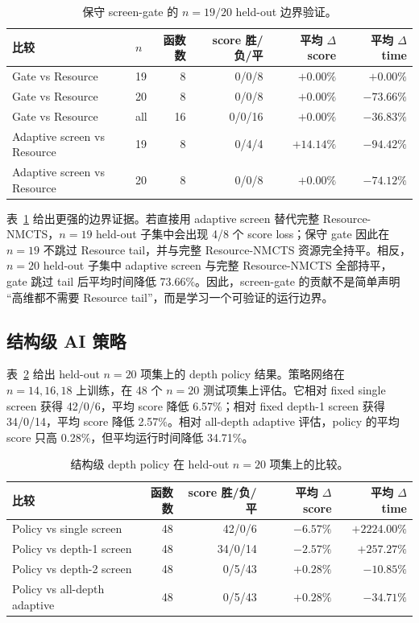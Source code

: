 \documentclass[UTF8,fontset=macnew,11pt]{ctexart}
\newcommand{\method}{Resource-NMCTS}
\begin{document}
\begin{table}[t]
\centering
\scriptsize
\caption{保守 screen-gate 的 $n=19/20$ held-out 边界验证。}
\label{tab:gate-holdout}
\begin{tabular}{llrrrr}
\toprule
比较 & $n$ & 函数数 & score 胜/负/平 & 平均 $\Delta$ score & 平均 $\Delta$ time \\
\midrule
Gate vs Resource & 19 & 8 & 0/0/8 & $+0.00\%$ & $+0.00\%$ \\
Gate vs Resource & 20 & 8 & 0/0/8 & $+0.00\%$ & $-73.66\%$ \\
Gate vs Resource & all & 16 & 0/0/16 & $+0.00\%$ & $-36.83\%$ \\
Adaptive screen vs Resource & 19 & 8 & 0/4/4 & $+14.14\%$ & $-94.42\%$ \\
Adaptive screen vs Resource & 20 & 8 & 0/0/8 & $+0.00\%$ & $-74.12\%$ \\
\bottomrule
\end{tabular}
\end{table}

表~\ref{tab:gate-holdout} 给出更强的边界证据。若直接用 adaptive screen 替代完整 \method{}，$n=19$ held-out 子集中会出现 4/8 个 score loss；保守 gate 因此在 $n=19$ 不跳过 Resource tail，并与完整 \method{} 资源完全持平。相反，$n=20$ held-out 子集中 adaptive screen 与完整 \method{} 全部持平，gate 跳过 tail 后平均时间降低 73.66\%。因此，screen-gate 的贡献不是简单声明 ``高维都不需要 Resource tail''，而是学习一个可验证的运行边界。

\subsection{结构级 AI 策略}

表~\ref{tab:policy} 给出 held-out $n=20$ 项集上的 depth policy 结果。策略网络在 $n=14,16,18$ 上训练，在 48 个 $n=20$ 测试项集上评估。它相对 fixed single screen 获得 42/0/6，平均 score 降低 6.57\%；相对 fixed depth-1 screen 获得 34/0/14，平均 score 降低 2.57\%。相对 all-depth adaptive 评估，policy 的平均 score 只高 0.28\%，但平均运行时间降低 34.71\%。

\begin{table}[t]
\centering
\small
\caption{结构级 depth policy 在 held-out $n=20$ 项集上的比较。}
\label{tab:policy}
\begin{tabular}{lrrrr}
\toprule
比较 & 函数数 & score 胜/负/平 & 平均 $\Delta$ score & 平均 $\Delta$ time \\
\midrule
Policy vs single screen & 48 & 42/0/6 & $-6.57\%$ & $+2224.00\%$ \\
Policy vs depth-1 screen & 48 & 34/0/14 & $-2.57\%$ & $+257.27\%$ \\
Policy vs depth-2 screen & 48 & 0/5/43 & $+0.28\%$ & $-10.85\%$ \\
Policy vs all-depth adaptive & 48 & 0/5/43 & $+0.28\%$ & $-34.71\%$ \\
\bottomrule
\end{tabular}
\end{table}
\end{document}
